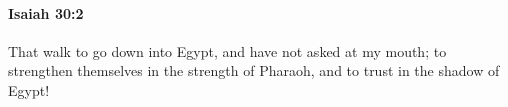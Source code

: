 
		\paragraph{Isaiah 30:2} %
			\label{ISAIAH-30-2}

			That walk to go down into Egypt, and have not asked at my mouth; to strengthen themselves in the strength of Pharaoh, and to trust in the shadow of Egypt!


